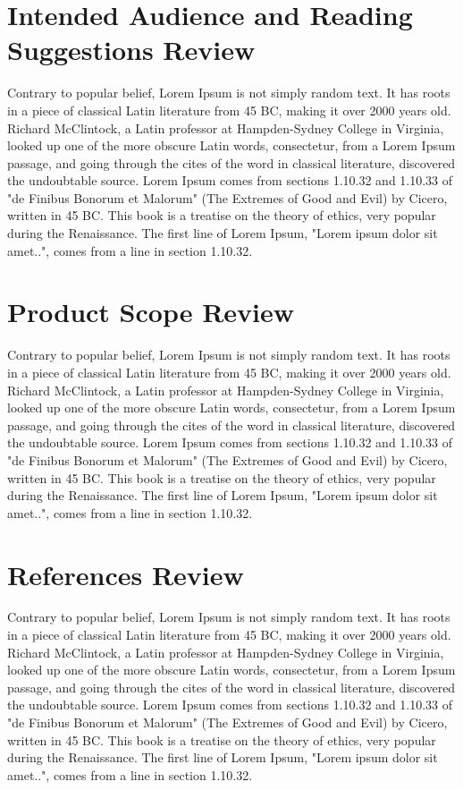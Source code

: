 \documentclass{scrreprt}
\begin{document}
    \section{Intended Audience and Reading Suggestions Review}
    Contrary to popular belief, Lorem Ipsum is not simply random text. It has roots in a piece of classical Latin literature from 45 BC, making it over 2000 years old. Richard McClintock, a Latin professor at Hampden-Sydney College in Virginia, looked up one of the more obscure Latin words, consectetur, from a Lorem Ipsum passage, and going through the cites of the word in classical literature, discovered the undoubtable source. Lorem Ipsum comes from sections 1.10.32 and 1.10.33 of "de Finibus Bonorum et Malorum" (The Extremes of Good and Evil) by Cicero, written in 45 BC. This book is a treatise on the theory of ethics, very popular during the Renaissance. The first line of Lorem Ipsum, "Lorem ipsum dolor sit amet..", comes from a line in section 1.10.32.
    \section{Product Scope Review}
    Contrary to popular belief, Lorem Ipsum is not simply random text. It has roots in a piece of classical Latin literature from 45 BC, making it over 2000 years old. Richard McClintock, a Latin professor at Hampden-Sydney College in Virginia, looked up one of the more obscure Latin words, consectetur, from a Lorem Ipsum passage, and going through the cites of the word in classical literature, discovered the undoubtable source. Lorem Ipsum comes from sections 1.10.32 and 1.10.33 of "de Finibus Bonorum et Malorum" (The Extremes of Good and Evil) by Cicero, written in 45 BC. This book is a treatise on the theory of ethics, very popular during the Renaissance. The first line of Lorem Ipsum, "Lorem ipsum dolor sit amet..", comes from a line in section 1.10.32.
    \section{References Review} 
    Contrary to popular belief, Lorem Ipsum is not simply random text. It has roots in a piece of classical Latin literature from 45 BC, making it over 2000 years old. Richard McClintock, a Latin professor at Hampden-Sydney College in Virginia, looked up one of the more obscure Latin words, consectetur, from a Lorem Ipsum passage, and going through the cites of the word in classical literature, discovered the undoubtable source. Lorem Ipsum comes from sections 1.10.32 and 1.10.33 of "de Finibus Bonorum et Malorum" (The Extremes of Good and Evil) by Cicero, written in 45 BC. This book is a treatise on the theory of ethics, very popular during the Renaissance. The first line of Lorem Ipsum, "Lorem ipsum dolor sit amet..", comes from a line in section 1.10.32.
    
\end{document}
